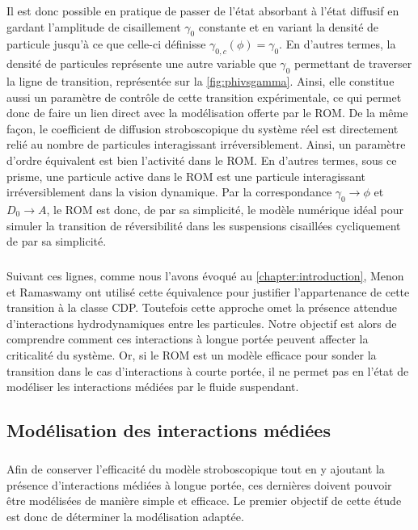 \noindent Il est donc possible en pratique de passer de l'état absorbant à l'état diffusif en gardant l'amplitude de cisaillement $\gamma_0$ constante et en variant la densité de particule jusqu'à ce que celle-ci définisse $\gamma_{0,c}(\phi) = \gamma_0$. En d'autres termes, la densité de particules représente une autre variable que $\gamma_0$ permettant de traverser la ligne de transition, représentée sur la \autoref{fig:phivsgamma}. Ainsi, elle constitue aussi un paramètre de contrôle de cette transition expérimentale, ce qui permet donc de faire un lien direct avec la modélisation offerte par le ROM. De la même façon, le coefficient de diffusion stroboscopique du système réel est directement relié au nombre de particules interagissant irréversiblement. Ainsi, un paramètre d'ordre équivalent est bien l'activité dans le ROM. En d'autres termes, sous ce prisme, une particule active dans le ROM est une particule interagissant irréversiblement dans la vision dynamique. Par la correspondance $\gamma_0 \rightarrow \phi$ et $D_0\rightarrow A$, le ROM est donc, de par sa simplicité, le modèle numérique idéal pour simuler la transition de réversibilité dans les suspensions cisaillées cycliquement de par sa simplicité.

\subparagraph{}Suivant ces lignes, comme nous l'avons évoqué au \autoref{chapter:introduction}, Menon et Ramaswamy \cite{menon_universality_2009} ont utilisé cette équivalence pour justifier l'appartenance de cette transition à la classe CDP. Toutefois cette approche omet la présence attendue d'interactions hydrodynamiques entre les particules. Notre objectif est alors de comprendre comment ces interactions à longue portée peuvent affecter la criticalité du système. Or, si le ROM est un modèle efficace pour sonder la transition dans le cas d'interactions à courte portée, il ne permet pas en l'état de modéliser les interactions médiées par le fluide suspendant.

\subsection{Modélisation des interactions médiées}


\subparagraph{}Afin de conserver l'efficacité du modèle stroboscopique tout en y ajoutant la présence d'interactions médiées à longue portée, ces dernières doivent pouvoir être modélisées de manière simple et efficace. Le premier objectif de cette étude est donc de déterminer la modélisation adaptée.

